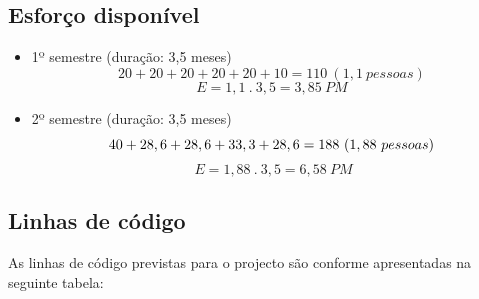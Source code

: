 \documentclass[12pt, a4paper, twoside]{report} %
\begin{document}
\subsection{Esforço disponível}

\begin{itemize}

\item 1º semestre (duração: 3,5 meses)
\begin{equation}
20+20+20+20+20+10 = 110 \ (1,1 \ pessoas)
\end{equation}
\begin{equation}
E = 1,1 \ . \ 3,5 = 3,85 \ PM
\end{equation}
\item 2º semestre (duração: 3,5 meses)
\begin{equation}
40+28,6+28,6+33,3+28,6 = 188 \ (1,88 \ pessoas)\\
\end{equation}
\begin{equation}
\ E = 1,88 \ . \ 3,5 = 6, 58 \ PM
\end{equation}
\end{itemize}

\subsection{Linhas de código}

As linhas de código previstas para o projecto são conforme apresentadas na seguinte tabela:
\end{document}
